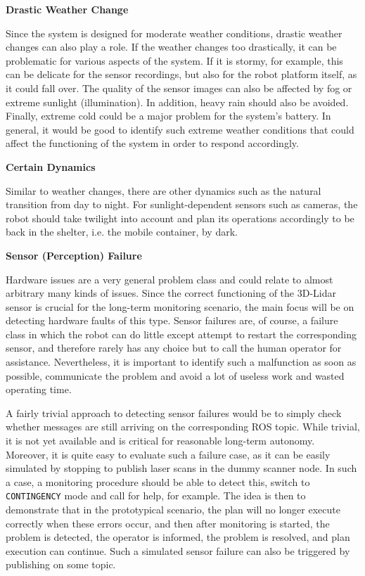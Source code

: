 \documentclass[english, master, utf8]{base/thesis_KBS}
\newcommand{\code}[1]{\colorbox{light-gray}{\texttt{#1}}}
\begin{document}
\noindent
\textbf{Drastic Weather Change}\newline

\noindent
Since the system is designed for moderate weather conditions, drastic weather changes can also play a role.
If the weather changes too drastically, it can be problematic for various aspects of the system.
If it is stormy, for example, this can be delicate for the sensor recordings, but also for the robot platform itself, as it could fall over.
The quality of the sensor images can also be affected by fog or extreme sunlight (illumination).
In addition, heavy rain should also be avoided. Finally, extreme cold could be a major problem for the system's battery.
In general, it would be good to identify such extreme weather conditions that could affect the functioning of the system in order to respond accordingly.\newline

\noindent
\textbf{Certain Dynamics}\newline

\noindent
Similar to weather changes, there are other dynamics such as the natural transition from day to night. For sunlight-dependent sensors such as cameras, 
the robot should take twilight into account and plan its operations accordingly to be back in the shelter, i.e. the mobile container, by dark.\newline

\noindent
\textbf{Sensor (Perception) Failure}\newline

\noindent
Hardware issues are a very general problem class and could relate to almost arbitrary many kinds of issues.
Since the correct functioning of the 3D-Lidar sensor is crucial for the long-term monitoring scenario,
the main focus will be on detecting hardware faults of this type. Sensor failures are, of course, a failure class in which the robot can do little except 
attempt to restart the corresponding sensor, and therefore rarely has any choice but to call the human operator for assistance. 
Nevertheless, it is important to identify such a malfunction as soon as possible, communicate the problem and avoid a lot of useless work and wasted operating time.

A fairly trivial approach to detecting sensor failures would be to simply check whether messages are still arriving on the corresponding ROS topic.
While trivial, it is not yet available and is critical for reasonable long-term autonomy. Moreover, it is quite easy to evaluate such a failure case,
as it can be easily simulated by stopping to publish laser scans in the dummy scanner node. In such a case, a monitoring procedure should be able to detect this,
switch to \code{CONTINGENCY} mode and call for help, for example. The idea is then to demonstrate that in the prototypical scenario, the plan will no longer 
execute correctly when these errors occur, and then after monitoring is started, the problem is detected, the operator is informed, the problem is resolved, 
and plan execution can continue. Such a simulated sensor failure can also be triggered by publishing on some topic.\newline
\end{document}
